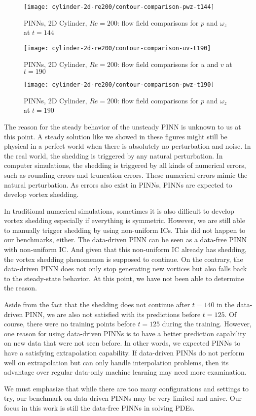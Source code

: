 \begin{figure}[hbt!]
    \texttt{[image: cylinder-2d-re200/contour-comparison-pwz-t144]}
    \caption{PINNs, 2D Cylinder, $Re=200$: flow field comparisons for $p$ and $\omega_z$ at $t=144$}
    \label{fig:cylinder-re200-contour-pwz-t144}
\end{figure}

\begin{figure}[hbt!]
    \texttt{[image: cylinder-2d-re200/contour-comparison-uv-t190]}
    \caption{PINNs, 2D Cylinder, $Re=200$: flow field comparisons for $u$ and $v$ at $t=190$}
    \label{fig:cylinder-re200-contour-uv-t190}
\end{figure}

\begin{figure}[hbt!]
    \texttt{[image: cylinder-2d-re200/contour-comparison-pwz-t190]}
    \caption{PINNs, 2D Cylinder, $Re=200$: flow field comparisons for $p$ and $\omega_z$ at $t=190$}
    \label{fig:cylinder-re200-contour-pwz-t190}
\end{figure}

The reason for the steady behavior of the unsteady PINN is unknown to us at this point.
A steady solution like we showed in these figures might still be physical in a perfect world when there is absolutely no perturbation and noise.
In the real world, the shedding is triggered by any natural perturbation.
In computer simulations, the shedding is triggered by all kinds of numerical errors, such as rounding errors and truncation errors.
These numerical errors mimic the natural perturbation.
As errors also exist in PINNs, PINNs are expected to develop vortex shedding.

In traditional numerical simulations, sometimes it is also difficult to develop vortex shedding especially if everything is symmetric.
However, we are still able to manually trigger shedding by using non-uniform ICs.
This did not happen to our benchmarks, either.
The data-driven PINN can be seen as a data-free PINN with non-uniform IC.
And given that this non-uniform IC already has shedding, the vortex shedding phenomenon is supposed to continue.
On the contrary, the data-driven PINN does not only stop generating new vortices but also falls back to the steady-state behavior.
At this point, we have not been able to determine the reason.

Aside from the fact that the shedding does not continue after $t=140$ in the data-driven PINN, we are also not satisfied with its predictions before $t=125$.
Of course, there were no training points before $t=125$ during the training.
However, one reason for using data-driven PINNs is to have a better prediction capability on new data that were not seen before.
In other words, we expected PINNs to have a satisfying extrapolation capability.
If data-driven PINNs do not perform well on extrapolation but can only handle interpolation problems, then its advantage over regular data-only machine learning may need more examination.

We must emphasize that while there are too many configurations and settings to try, our benchmark on data-driven PINNs may be very limited and naive.
Our focus in this work is still the data-free PINNs in solving PDEs.
